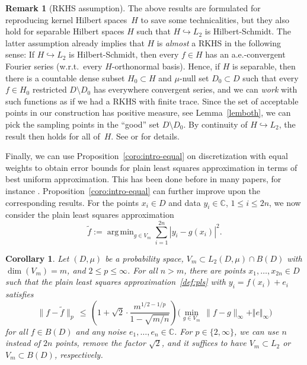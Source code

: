 \documentclass[a4paper,11pt]{article}
\renewcommand{\(}{\left (}
\renewcommand{\)}{\right )}
\newcommand{\<}{\langle}
\renewcommand{\>}{\rangle}
\newcommand{\C}{\mathbb{C}}
\newtheorem{coro}[theorem]{Corollary}
\theoremstyle{definition}
\newtheorem{remark}[theorem]{Remark}
\DeclareMathOperator*{\argmin}{arg\,min}
\begin{document}
\begin{remark}[RKHS assumption]
The above results are formulated for reproducing kernel Hilbert spaces~$H$ to save some technicalities, 
but they also hold for separable Hilbert spaces $H$ such that $H\hookrightarrow L_2$ is Hilbert-Schmidt. The latter assumption 
already implies that $H$ is \emph{almost} a RKHS in the following sense: 
If $H\hookrightarrow L_2$ is Hilbert-Schmidt, then every $f\in H$ has an a.e.-convergent Fourier series (w.r.t.~every $H$-orthonormal basis). 
Hence, if $H$ is separable, then there is a countable dense subset $H_0\subset H$ and $\mu$-null set $D_0\subset D$ 
such that every $f\in H_0$ restricted $D\setminus D_0$ has everywhere convergent series, 
and we can \emph{work} with such functions as if we had a RKHS with finite trace.
Since the set of acceptable points in our construction has positive measure, see Lemma~\ref{lemboth}, we can pick the sampling points in the ``good'' set $D \setminus D_0$.
By continuity of $H\hookrightarrow L_2$, the result then holds for all of~$H$.
See \cite[Sec.\,4]{MU} or \cite[Sec.\,2]{DKU} for details.
\end{remark}

\medskip

Finally,
we can use Proposition~\ref{coro:intro-equal}
on discretization with equal weights
to obtain error bounds for plain least squares approximation 
in terms of best uniform approximation.
This has been done before in many papers,
for instance \cite{BSU,ChkifaDolbeault24,KPUU25-uniform,PU,T20}.
Proposition~\ref{coro:intro-equal} can further improve upon
the corresponding results.
For the points $x_i \in D$ 
and data $y_i\in\C$, $1\leq i\leq 2n$,
we now consider the plain least squares approximation
\begin{equation}\label{def:pls}
\tilde f := \argmin_{g\in V_m} \sum_{i=1}^{2n} |y_i -g(x_i)|^2.
\end{equation}

\begin{coro}\label{cor:recovery-unif}
Let $(D,\mu)$ be a probability space, $V_m\subset L_2(D,\mu)\cap B(D)$ with $\dim(V_m)=m$, 
and $2\le p\le\infty$. 
For all $n> m$,
there are points $x_1,\hdots,x_{2n} \in D$
such that the plain least squares 
approximation~\eqref{def:pls} 
with $y_i = f(x_i) + e_i$
satisfies
\[
\big\|f- \tilde f\big\|_p 
\,\leq\, \left(1 + \sqrt{2}\cdot\frac{m^{1/2-1/p}}{1-\sqrt{m/n}}\right) \Big( \min_{g\in V_m} \,\big\|f-g\big\|_\infty + \Vert e \Vert_\infty \Big)
\]
for all $f\in B(D)$ and any noise $e_1,\hdots,e_n \in \C$.
For $p\in\{2,\infty\}$, we can use $n$ instead of $2n$ points, remove the factor $\sqrt{2}$, 
and it suffices to have $V_m \subset L_2$ or $V_m \subset B(D)$, respectively.
\end{coro}
\end{document}
